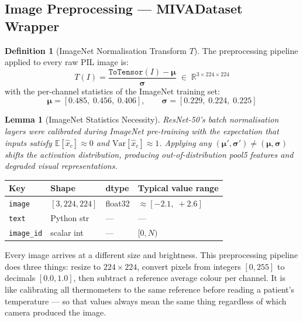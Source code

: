 \documentclass[12pt, a4paper]{article}
\theoremstyle{definition}
\newtheorem{definition}{Definition}[section]
\theoremstyle{plain}
\newtheorem{lemma}{Lemma}[section]
\theoremstyle{remark}
\begin{document}
\subsection{Image Preprocessing --- MIVADataset Wrapper}

\begin{definition}[ImageNet Normalisation Transform $T$]
The preprocessing pipeline applied to every raw PIL image is:
\[
  T(I) = \frac{\texttt{ToTensor}(I) - \boldsymbol{\mu}}{\boldsymbol{\sigma}}
  \;\in\; \mathbb{R}^{3\times 224\times 224}
\]
with the per-channel statistics of the ImageNet training set:
\[
  \boldsymbol{\mu} = [0.485,\; 0.456,\; 0.406], \qquad
  \boldsymbol{\sigma} = [0.229,\; 0.224,\; 0.225]
\]
\end{definition}

\begin{lemma}[ImageNet Statistics Necessity]
\label{lem:imagenet}
ResNet-50's batch normalisation layers were calibrated during ImageNet
pre-training with the expectation that inputs satisfy
$\mathbb{E}[\hat{x}_c] \approx 0$ and $\mathrm{Var}[\hat{x}_c] \approx 1$.
Applying any $(\boldsymbol{\mu}', \boldsymbol{\sigma}') \neq
(\boldsymbol{\mu}, \boldsymbol{\sigma})$ shifts the activation distribution,
producing out-of-distribution pool5 features and degraded visual representations.
\end{lemma}

\begin{center}
\renewcommand{\arraystretch}{1.2}
\begin{tabular}{@{}llll@{}}
\toprule
\textbf{Key} & \textbf{Shape} & \textbf{dtype} & \textbf{Typical value range} \\
\midrule
\texttt{image}    & $[3, 224, 224]$ & float32 & $\approx [-2.1,\;+2.6]$ \\
\texttt{text}     & Python str      & ---     & --- \\
\texttt{image\_id} & scalar int     & ---     & $[0, N)$ \\
\bottomrule
\end{tabular}
\end{center}

\begin{tcolorbox}[layman]
Every image arrives at a different size and brightness.  This preprocessing
pipeline does three things: resize to $224\!\times\!224$, convert pixels
from integers $[0,255]$ to decimals $[0.0,1.0]$, then subtract a reference
average colour per channel.  It is like calibrating all thermometers to
the same reference before reading a patient's temperature --- so that
values always mean the same thing regardless of which camera produced
the image.
\end{tcolorbox}
\end{document}
